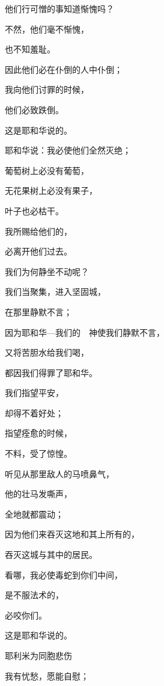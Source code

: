 {\par }{\Q {}他们行可憎的事知道惭愧吗？
\par }{\Q 不然，他们毫不惭愧，
\par }{\Q 也不知羞耻。
\par }{\Q 因此他们必在仆倒的人中仆倒；
\par }{\Q 我向他们讨罪的时候，
\par }{\Q 他们必致跌倒。
\par }{\Q 这是耶和华说的。
\par }{\BB \par }{\Q {}耶和华说：我必使他们全然灭绝；
\par }{\Q 葡萄树上必没有葡萄，
\par }{\Q 无花果树上必没有果子，
\par }{\Q 叶子也必枯干。
\par }{\Q 我所赐给他们的，
\par }{\Q 必离开他们过去。
\par }{\BB \par }{\Q {}我们为何静坐不动呢？
\par }{\Q 我们当聚集，进入坚固城，
\par }{\Q 在那里静默不言；
\par }{\Q 因为耶和华—我们的　神使我们静默不言，
\par }{\Q 又将苦胆水给我们喝，
\par }{\Q 都因我们得罪了耶和华。
\par }{\Q {}我们指望平安，
\par }{\Q 却得不着好处；
\par }{\Q 指望痊愈的时候，
\par }{\Q 不料，受了惊惶。
\par }{\BB \par }{\Q {}听见从{}那里敌人的马喷鼻气，
\par }{\Q 他的壮马发嘶声，
\par }{\Q 全地就都震动；
\par }{\Q 因为他们来吞灭这地和其上所有的，
\par }{\Q 吞灭这城与其中的居民。
\par }{\BB \par }{\Q {}看哪，我必使毒蛇到你们中间，
\par }{\Q 是不服法术的，
\par }{\Q 必咬你们。
\par }{\Q 这是耶和华说的。
\par }{\SH 耶利米为同胞悲伤
\par }{\Q {}我有忧愁，愿能自慰；
}
